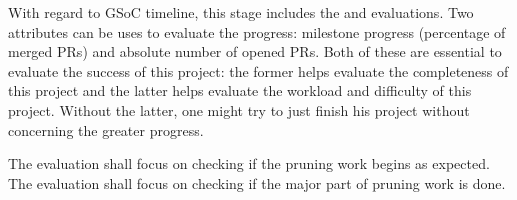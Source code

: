 With regard to GSoC timeline, this stage includes the  and  evaluations. Two attributes can be uses to evaluate the progress: milestone progress (percentage of merged PRs) and absolute number of opened PRs. Both of these are essential to evaluate the success of this project: the former helps evaluate the completeness of this project and the latter helps evaluate the workload and difficulty of this project. Without the latter, one might try to just finish his project without concerning the greater \images{}  progress. \par

The  evaluation shall focus on checking if the pruning work begins as expected. The  evaluation shall focus on checking if the major part of pruning work is done.
